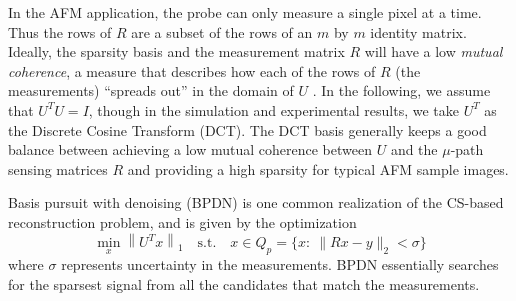 \documentclass[twocolumn,oneside]{IEEEtran/IEEEtran}
\begin{document}
	
In the AFM application, the probe can only measure a single pixel at a
time. Thus the rows of $R$ are a subset of the rows of an $m$ by $m$
identity matrix. Ideally, the sparsity basis and the measurement
matrix $R$ will have a low \textit{mutual coherence}, a measure that
describes how each of the rows of $R$ (the measurements) ``spreads
out'' in the domain of $U$ \cite{candes2007sparsity}. In the
following, we assume that $U^TU=I$, though in the simulation and
experimental results, we take $U^T$ as the Discrete Cosine Transform
(DCT). The DCT basis generally keeps a good balance between achieving
a low mutual coherence between $U$ and the $\mu$-path sensing matrices
$R$ and providing a high sparsity for typical AFM sample images.
	
Basis pursuit with denoising (BPDN) is one common realization of the
CS-based reconstruction problem, and is given by the optimization
\begin{equation}
  \min_{x} \left \| U^Tx \right \|_1 \quad
  \text{s.t.}\quad x\in Q_p = \{x:~\|Rx - y\|_2 < \sigma\} \label{op:bp}
\end{equation}
where $\sigma$ represents uncertainty in the measurements. BPDN
essentially searches for the sparsest signal from all the candidates
that match the measurements.
\end{document}
